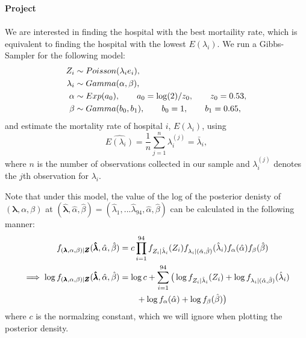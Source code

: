 \documentclass[12pt, leqno]{article}
\begin{document}
\pagestyle{fancy}

\begin{center}
{\large {\bf Project}} \\
\end{center}

\paragraph{} We are interested in finding the hospital with the best
mortaility rate, which is equivalent to finding the hospital with the
lowest $E(\lambda_i)$. We run a Gibbs-Sampler for the following model:
\begin{align}
Z_i & \sim Poisson(\lambda_i e_i), \notag \\
\lambda_i & \sim Gamma(\alpha, \beta), \notag \\
\alpha & \sim Exp(a_0), \qquad{} a_0 = \log(2)/z_0, \qquad{} z_0 = 0.53, \notag \\
\beta & \sim Gamma(b_0, b_1),  \qquad{} b_0 = 1, \qquad{} b_1 = 0.65, \notag 
\end{align}
and estimate the mortality rate of hospital $i$, $E(\lambda_i)$, using 
\[
\widehat{E(\lambda_i)} = \frac{1}{n} \sum_{j=1}^n \lambda_i^{(j)} = \bar{\lambda}_i,
\]
where $n$ is the number of observations collected in our sample and $\lambda_i^{(j)}$
denotes the $j$th observation for $\lambda_i$.

Note that under this model, the value of the log of the posterior
denisty of $(\pmb{\lambda},{\alpha},{\beta})$ at
$(\pmb{\hat{\lambda}},\hat{\alpha},\hat{\beta}) =
(\hat{\lambda}_1,... \hat{\lambda}_{94},\hat{\alpha},\hat{\beta})$ can
be calculated in the following manner:
\begin{align}
f_{(\pmb{\lambda},{\alpha},{\beta})|\pmb{Z}} (\pmb{\hat{\lambda}},\hat{\alpha},\hat{\beta}) &=
c \prod_{i=1}^{94} f_{Z_i|\hat{\lambda}_i}(Z_i)
f_{\lambda_i|(\hat{\alpha},\hat{\beta})}(\hat{\lambda}_i)
f_{{\alpha}}(\hat{\alpha}) f_{{\beta}}(\hat{\beta})\notag \\
\implies \log f_{(\pmb{\lambda},{\alpha},{\beta})|\pmb{Z}} (\pmb{\hat{\lambda}},\hat{\alpha},\hat{\beta}) 
&= \log c + 
\sum_{i=1}^{94} \big(\log f_{Z_i|\hat{\lambda}_i}(Z_i) + 
\log f_{\lambda_i|(\hat{\alpha},\hat{\beta})}(\hat{\lambda}_i)
\notag \\ 
&\qquad + \log f_{{\alpha}}(\hat{\alpha}) + \log
f_{{\beta}}(\hat{\beta}) \big)
\notag 
\end{align}
where $c$ is the normalzing constant, which we will ignore when
plotting the posterior density.
\end{document}

